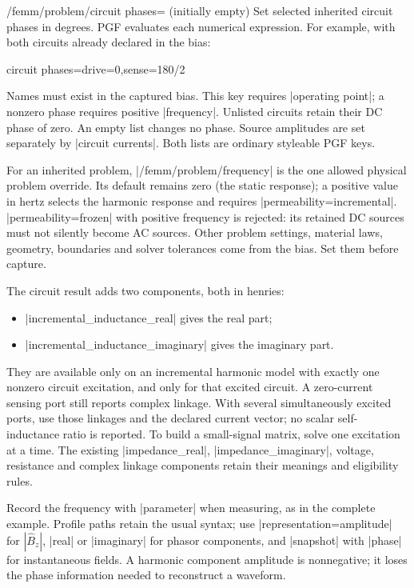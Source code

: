 \newpage
\begin{key}{/femm/problem/circuit phases= (initially empty)}
Set selected inherited circuit phases in degrees. PGF evaluates each numerical
expression. For example, with both circuits already declared in the bias:
\begin{codeexample}
circuit phases={drive=0,sense=180/2}
\end{codeexample}
Names must exist in the captured bias. This key requires |operating point|;
a nonzero phase requires positive |frequency|. Unlisted circuits retain their
DC phase of zero. An empty list changes no phase. Source amplitudes are set
separately by |circuit currents|. Both lists are ordinary styleable PGF keys.
\end{key}

For an inherited problem, |/femm/problem/frequency| is the one allowed physical
problem override. Its default remains zero (the static response); a positive
value in hertz selects the harmonic response and requires
|permeability=incremental|. |permeability=frozen| with positive frequency is
rejected: its retained DC sources must not silently become AC sources. Other
problem settings, material laws, geometry, boundaries and solver tolerances
come from the bias. Set them before capture.

The circuit result adds two components, both in henries:
\begin{itemize}
\item |incremental_inductance_real| gives the real part;
\item |incremental_inductance_imaginary| gives the imaginary part.
\end{itemize}
They are available only on
an incremental harmonic model with exactly one nonzero circuit excitation,
and only for that excited circuit. A zero-current sensing port still reports
complex linkage. With several simultaneously excited ports, use those linkages
and the declared current vector; no scalar self-inductance ratio is reported.
To build a small-signal matrix, solve one excitation at a time. The existing
|impedance_real|, |impedance_imaginary|, voltage, resistance and complex linkage
components retain their meanings and eligibility rules.
\begin{codeexample}
\femmresultplot[results={port-low-5,port-low-10,port-low-20},
  component=incremental_inductance_real,
  plot options={blue!65!black,thick,mark=*}]
\end{codeexample}
Record the frequency with |parameter| when measuring, as in the complete
example. Profile paths retain the usual syntax; use |representation=amplitude|
for $|\widehat B_z|$, |real| or |imaginary| for phasor components, and |snapshot|
with |phase| for instantaneous fields. A harmonic component amplitude is
nonnegative; it loses the phase information needed to reconstruct a waveform.

